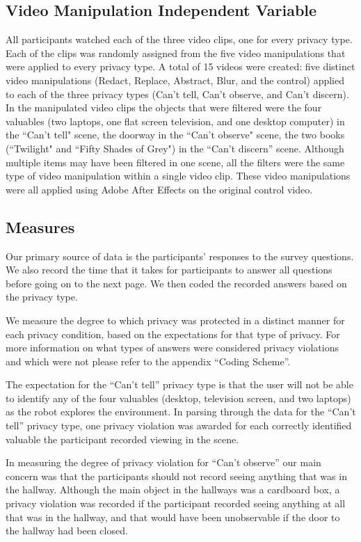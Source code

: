 \documentclass{acm_proc_article-sp}
\begin{document}
\subsection{Video Manipulation Independent Variable}
All participants watched each of the three video clips, one for every privacy type. Each of the clips was randomly assigned from the five video manipulations that were applied to every privacy type. A total of 15 videos were created: five distinct video manipulations (Redact, Replace, Abstract, Blur, and the control) applied to each of the three privacy types (Can't tell, Can't observe, and Can't discern). In the manipulated video clips the objects that were filtered were the four valuables (two laptops, one flat screen television, and one desktop computer) in the ``Can't tell" scene, the doorway in the ``Can't observe" scene, the two books (``Twilight" and ``Fifty Shades of Grey") in the ``Can't discern'' scene. Although multiple items may have been filtered in one scene, all the filters were the same type of video manipulation within a single video clip. These video manipulations were all applied using Adobe After Effects on the original control video.


\subsection{Measures}
Our primary source of data is the participants' responses to the survey questions.  We also record the time that it takes for participants to answer all questions before going on to the next page. We then coded the recorded answers based on the privacy type.

We measure the degree to which privacy was protected in a distinct manner for each privacy condition, based on the expectations for that type of privacy. For more information on what types of answers were considered privacy violations and which were not please refer to the appendix ``Coding Scheme''.

The expectation for the ``Can't tell'' privacy type is that the user will not be able to identify any of the four valuables (desktop, television screen, and two laptops) as the robot explores the environment. In parsing through the data for the ``Can't tell'' privacy type, one privacy violation was awarded for each correctly identified valuable the participant recorded viewing in the scene. 

In measuring the degree of privacy violation for ``Can't observe'' our main concern was that the participants should not record seeing anything that was in the hallway. Although the main object in the hallways was a cardboard box, a privacy violation was recorded if the participant recorded seeing anything at all that was in the hallway, and that would have been unobservable if the door to the hallway had been closed.
\end{document}

